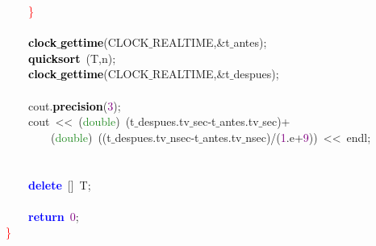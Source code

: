 \mbox{}\ \ \ \ \textcolor{Red}{\}} \\
\mbox{}\ \ \ \  \\
\mbox{}\ \ \ \ \textbf{\textcolor{Black}{clock$\_$gettime}}\textcolor{BrickRed}{(}CLOCK$\_$REALTIME\textcolor{BrickRed}{,\&}t$\_$antes\textcolor{BrickRed}{);} \\
\mbox{}\ \ \ \ \textbf{\textcolor{Black}{quicksort}}\ \textcolor{BrickRed}{(}T\textcolor{BrickRed}{,}n\textcolor{BrickRed}{);} \\
\mbox{}\ \ \ \ \textbf{\textcolor{Black}{clock$\_$gettime}}\textcolor{BrickRed}{(}CLOCK$\_$REALTIME\textcolor{BrickRed}{,\&}t$\_$despues\textcolor{BrickRed}{);} \\
\mbox{}\ \ \ \  \\
\mbox{}\ \ \ \ cout\textcolor{BrickRed}{.}\textbf{\textcolor{Black}{precision}}\textcolor{BrickRed}{(}\textcolor{Purple}{3}\textcolor{BrickRed}{);} \\
\mbox{}\ \ \ \ cout\ \textcolor{BrickRed}{\textless{}\textless{}}\ \textcolor{BrickRed}{(}\textcolor{ForestGreen}{double}\textcolor{BrickRed}{)}\ \textcolor{BrickRed}{(}t$\_$despues\textcolor{BrickRed}{.}tv$\_$sec\textcolor{BrickRed}{-}t$\_$antes\textcolor{BrickRed}{.}tv$\_$sec\textcolor{BrickRed}{)+} \\
\mbox{}\ \ \ \ \ \ \ \ \textcolor{BrickRed}{(}\textcolor{ForestGreen}{double}\textcolor{BrickRed}{)}\ \textcolor{BrickRed}{((}t$\_$despues\textcolor{BrickRed}{.}tv$\_$nsec\textcolor{BrickRed}{-}t$\_$antes\textcolor{BrickRed}{.}tv$\_$nsec\textcolor{BrickRed}{)/(}\textcolor{Purple}{1}\textcolor{BrickRed}{.}e\textcolor{BrickRed}{+}\textcolor{Purple}{9}\textcolor{BrickRed}{))}\ \textcolor{BrickRed}{\textless{}\textless{}}\ endl\textcolor{BrickRed}{;} \\
\mbox{} \\
\mbox{}\ \ \ \  \\
\mbox{}\ \ \ \ \textbf{\textcolor{Blue}{delete}}\ \textcolor{BrickRed}{[]}\ T\textcolor{BrickRed}{;} \\
\mbox{}\ \ \ \  \\
\mbox{}\ \ \ \ \textbf{\textcolor{Blue}{return}}\ \textcolor{Purple}{0}\textcolor{BrickRed}{;} \\
\mbox{}\textcolor{Red}{\}} \\
\mbox{}
